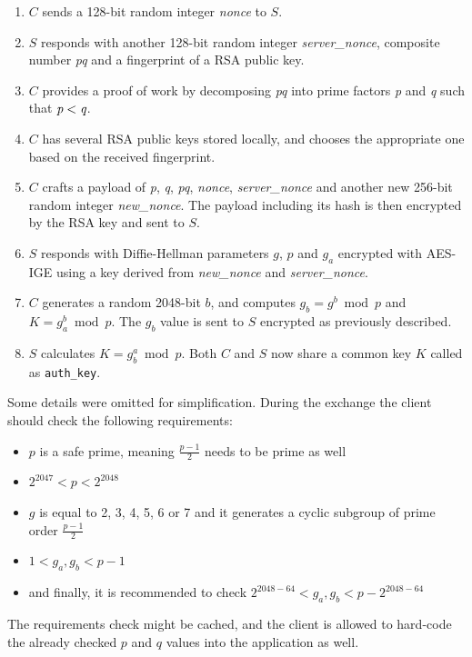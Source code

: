 \documentclass[thesis=M,english]{FITthesis}[2012/10/20]
\begin{document}
\begin{enumerate}
	\item $C$ sends a 128-bit random integer \emph{nonce} to $S$.
	\item $S$ responds with another 128-bit random integer \emph{server\_nonce}, composite number \emph{pq} and a fingerprint of a RSA public key.
	\item $C$ provides a proof of work by decomposing \emph{pq} into prime factors \emph{p} and \emph{q} such that $\emph{p} < \emph{q}$.
	\item $C$ has several RSA public keys stored locally, and chooses the appropriate one based on the received fingerprint.
	\item $C$ crafts a payload of \emph{p}, \emph{q}, \emph{pq}, \emph{nonce}, \emph{server\_nonce} and another new 256-bit random integer \emph{new\_nonce}. The payload including its hash is then encrypted by the RSA key and sent to $S$.
	\item $S$ responds with Diffie-Hellman parameters $g$, $p$ and $g_a$ encrypted with AES-IGE using a key derived from \emph{new\_nonce} and \emph{server\_nonce}.\label{crypto-initialization-6}
	\item $C$ generates a random 2048-bit $b$, and computes $g_b = g^b \bmod p$ and $K = g_a^b \bmod p$. The $g_b$ value is sent to $S$ encrypted as previously described.
	\item $S$ calculates $K = g_b^a \bmod p$. Both $C$ and $S$ now share a common key $K$ called as \texttt{auth\_key}.
\end{enumerate}

Some details were omitted for simplification. During the exchange the client should check the following requirements:\label{crypto-prime-req}

\begin{itemize}
	\item $p$ is a safe prime, meaning $\frac{p-1}{2}$ needs to be prime as well
	\item $2^{2047} < p < 2^{2048}$
	\item $g$ is equal to 2, 3, 4, 5, 6 or 7 and it generates a cyclic subgroup of prime order $\frac{p-1}{2}$
	\item $1 < g_a, g_b < p-1$
	\item and finally, it is recommended to check $2^{2048-64} < g_a, g_b < p - 2^{2048-64}$
\end{itemize}

The requirements check might be cached, and the client is allowed to hard-code the already checked $p$ and $q$ values into the application as well.
\end{document}
